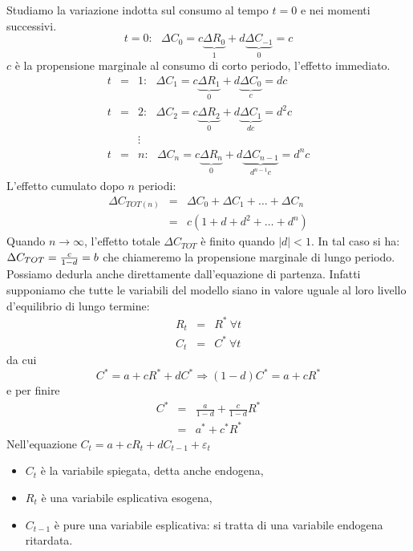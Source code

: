 \documentclass[a4paper]{report}
\theoremstyle{remark}
\begin{document}
Studiamo la variazione indotta sul consumo al tempo $t=0$ e nei momenti
successivi.%
\begin{equation*}
t=0:\ \ \ \Delta C_{0}=c\underset{1}{\underbrace{\Delta R_{0}}}+d\underset{0}%
{\underbrace{\Delta C_{-1}}}=c
\end{equation*}%
$c$ \`{e} la propensione marginale al consumo di corto periodo, l'effetto
immediato. 
\begin{eqnarray*}
t &=&1:\ \ \ \Delta C_{1}=c\underset{0}{\underbrace{\Delta R_{1}}}+d\underset%
{c}{\underbrace{\Delta C_{0}}}=dc \\
t &=&2:\ \ \ \Delta C_{2}=c\underset{0}{\underbrace{\Delta R_{2}}}+d\underset%
{dc}{\underbrace{\Delta C_{1}}}=d^{2}c \\
&&\vdots \\
t &=&n:\ \ \ \Delta C_{n}=c\underset{0}{\underbrace{\Delta R_{n}}}+d\underset%
{d^{n-1}c}{\underbrace{\Delta C_{n-1}}}=d^{n}c
\end{eqnarray*}%
L'effetto cumulato dopo $n$ periodi:%
\begin{eqnarray*}
\Delta C_{TOT(n)} &=&\Delta C_{0}+\Delta C_{1}+\ldots +\Delta C_{n} \\
&=&c\left( 1+d+d^{2}+\ldots +d^{n}\right)
\end{eqnarray*}%
Quando $n\rightarrow \infty $, l'effetto totale $\Delta C_{TOT}$ \`{e}
finito quando $\mid d\mid <1$. In tal caso si ha: $\Delta C_{TOT}=\frac{c}{%
1-d}=b$ che chiameremo la propensione marginale di lungo periodo. Possiamo
dedurla anche direttamente dall'equazione di partenza. Infatti supponiamo
che tutte le variabili del modello siano in valore uguale al loro livello
d'equilibrio di lungo termine:%
\begin{eqnarray*}
R_{t} &=&R^{\ast }\ \forall t \\
C_{t} &=&C^{\ast }\ \forall t
\end{eqnarray*}%
da cui%
\begin{equation*}
C^{\ast }=a+cR^{\ast }+dC^{\ast }\Rightarrow (1-d)C^{\ast }=a+cR^{\ast }
\end{equation*}%
e per finire%
\begin{eqnarray*}
C^{\ast } &=&\frac{a}{1-d}+\frac{c}{1-d}R^{\ast } \\
&=&a^{\ast }+c^{\ast }R^{\ast }
\end{eqnarray*}%
Nell'equazione $C_{t}=a+cR_{t}+dC_{t-1}+\varepsilon _{t}$

\begin{itemize}
\item $C_{t}$ \`{e} la variabile spiegata, detta anche endogena,

\item $R_{t}$ \`{e} una variabile esplicativa esogena,

\item $C_{t-1}$ \`{e} pure una variabile esplicativa: si tratta di una
variabile endogena ritardata.
\end{itemize}
\end{document}

